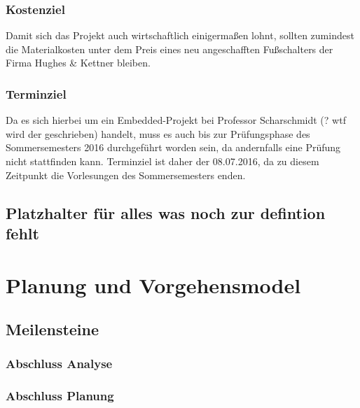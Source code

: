 \documentclass[10pt,a4paper]{report}
\begin{document}
\subsection{Kostenziel}
\begin{flushleft}

Damit sich das Projekt auch wirtschaftlich einigermaßen lohnt, sollten zumindest die Materialkosten unter dem Preis eines neu angeschafften Fußschalters der Firma Hughes \& Kettner bleiben.  

\end{flushleft}


\subsection{Terminziel}

\begin{flushleft}

Da es sich hierbei um ein Embedded-Projekt bei Professor Scharschmidt (? wtf wird der geschrieben) handelt, muss es auch bis zur Prüfungsphase des Sommersemesters 2016 durchgeführt worden sein, da andernfalls eine Prüfung nicht stattfinden kann. Terminziel ist daher der 08.07.2016, da zu diesem Zeitpunkt die Vorlesungen des Sommersemesters enden.

\end{flushleft}


\section{Platzhalter für alles was noch zur defintion fehlt}

\chapter{Planung und Vorgehensmodel}
\section{Meilensteine}

\subsection{Abschluss Analyse}
\subsection{Abschluss Planung}
\end{document}
